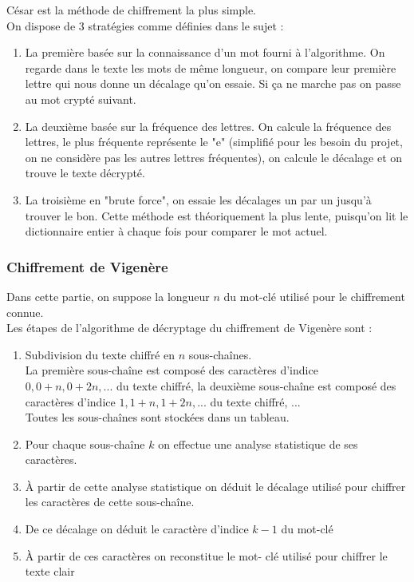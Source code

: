 \documentclass{article}
\begin{document}
César est la méthode de chiffrement la plus simple. \\
On dispose de 3 stratégies comme définies dans le sujet : \\
\begin{enumerate}
\item La première basée sur la connaissance d'un mot fourni à l'algorithme. On regarde dans le texte les mots de même longueur, on compare leur première lettre qui nous donne un décalage qu'on essaie. Si ça ne marche pas on passe au mot crypté suivant.
\item La deuxième basée sur la fréquence des lettres. On calcule la fréquence des lettres, le plus fréquente représente le "e" (simplifié pour les besoin du projet, on ne considère pas les autres lettres fréquentes), on calcule le décalage et on trouve le texte décrypté.
\item La troisième en "brute force", on essaie les décalages un par un jusqu'à trouver le bon. Cette méthode est théoriquement la plus lente, puisqu'on lit le dictionnaire entier à chaque fois pour comparer le mot actuel.
\end{enumerate}
\vspace{2\baselineskip}

\vspace{2\baselineskip}

\subsubsection{Chiffrement de Vigenère}
\vspace{1\baselineskip}

Dans cette partie, on suppose la longueur $n$ du mot-clé utilisé pour le chiffrement connue. \\
Les étapes de l'algorithme de décryptage du chiffrement de Vigenère sont : \\
\begin{enumerate}
\item Subdivision du texte chiffré en $n$ sous-chaînes. \\
La première sous-chaîne est composé des caractères d'indice $0, 0+n, 0+2n, ...$ du texte chiffré, la deuxième sous-chaîne est composé des caractères d'indice $1, 1+n, 1+2n, ...$ du texte chiffré, ... \\
Toutes les sous-chaînes sont stockées dans un tableau. \\
\item Pour chaque sous-chaîne $k$ on effectue une analyse statistique de ses caractères.
\item À partir de cette analyse statistique on déduit le décalage utilisé pour chiffrer les caractères de cette sous-chaîne.
\item De ce décalage on déduit le caractère d'indice $k-1$ du mot-clé
\item À partir de ces caractères on reconstitue le mot- clé utilisé pour chiffrer le texte clair
\end{enumerate}
\vspace{2\baselineskip}
\end{document}
